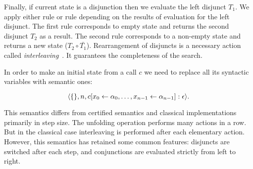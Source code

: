 Finally, if current state is a disjunction then we evaluate the left disjunct $T_1$. We apply either rule  or rule  depending
on the results of evaluation for the left disjunct. The first rule corresponds to empty state and returns the second disjunct $T_2$ as a result. The second rule corresponds
to a non-empty state and returns a new state ($T_2 \circ \bar{T_1}$). Rearrangement of disjuncts is a necessary action called \emph{interleaving}~\cite{fair:interleaving}.
It guarantees the completeness of the search.

In order to make an initial state from a call $c$ we need to replace all its syntactic variables with semantic ones:

\[
\langle \{\}, n, c[x_0 \leftarrow \alpha_0, \ldots, x_{n-1} \leftarrow \alpha_{n-1}] : \epsilon \rangle.
\]

This semantics differs from certified semantics and classical implementations primarily in step size. The unfolding operation performs many actions in a row.
But in the classical case interleaving is performed after each elementary action. However, this semantics has retained some common features: disjuncts are switched 
after each step, and conjunctions are evaluated strictly from left to right. 


